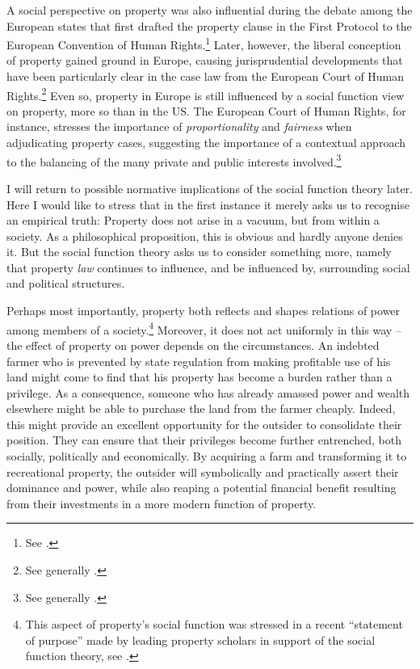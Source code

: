 A social perspective on property was also influential during the debate among the European states that first drafted the property clause in the First Protocol to the European Convention of Human Rights.\footnote{See \cite[1063-1065]{allen10}.} Later, however, the liberal conception of property gained ground in Europe, causing jurisprudential developments that have been particularly clear in the case law from the European Court of Human Rights.\footnote{See generally \cite{allen10}.} Even so, property  in Europe is still influenced by a social function view on property, more so than in the US. The European Court of Human Rights, for instance, stresses the importance of {\it proportionality} and {\it fairness} when adjudicating property cases, suggesting the importance of a contextual approach to the balancing of the many private and public interests involved.\footnote{See generally \cite[Chapter 5]{allen05}.}

I will return to possible normative implications of the social function theory later. Here I would like to stress that in the first instance it merely asks us to recognise an empirical truth: Property does not arise in a vacuum, but from within a society. As a philosophical proposition, this is obvious and hardly anyone denies it. But the social function theory asks us to consider something more, namely that property {\it law} continues to influence, and be influenced by, surrounding social and political structures.

Perhaps most importantly, property both reflects and shapes relations of power among members of a society.\footnote{This aspect of property's social function was stressed in a recent ``statement of purpose'' made by leading property scholars in support of the social function theory, see \cite{alexander09a}.} Moreover, it does not act uniformly in this way -- the effect of property on power depends on the circumstances. An indebted farmer who is prevented by state regulation from making profitable use of his land might come to find that his property has become a burden rather than a privilege. As a consequence, someone who has already amassed power and wealth elsewhere might be able to purchase the land from the farmer cheaply. Indeed, this might provide an excellent opportunity for the outsider to consolidate their position. They can ensure that their privileges become further entrenched, both socially, politically and economically. By acquiring a farm and transforming it to recreational property, the outsider will symbolically and practically assert their dominance and power, while also reaping a potential financial benefit resulting from their investments in a more modern function of property. 

